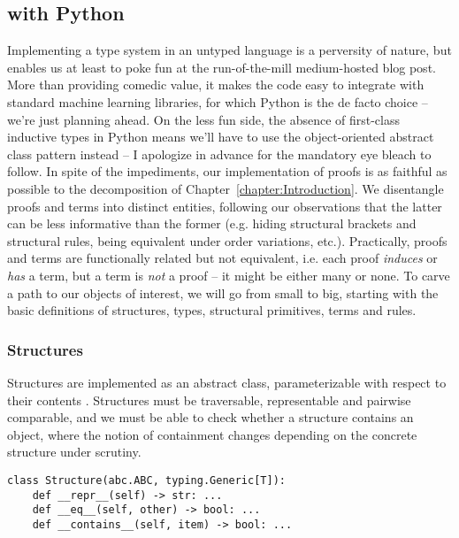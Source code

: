 \subsection{\NLPplus{} with Python}
\label{subappendix:nlp}
Implementing a type system in an untyped language is a perversity of nature, but enables us at least to poke fun at the run-of-the-mill medium-hosted blog post.
More than providing comedic value, it makes the code easy to integrate with standard machine learning libraries, for which Python is the de facto choice -- we're just planning ahead.
On the less fun side, the absence of first-class inductive types in Python means we'll have to use the object-oriented  abstract class pattern instead -- I apologize in advance for the mandatory eye bleach to follow.
In spite of the impediments, our implementation of \NLPplus{} proofs is as faithful as possible to the decomposition of Chapter~\ref{chapter:Introduction}.
We disentangle proofs and terms into distinct entities, following our observations that the latter can be less informative than the former (e.g. hiding structural brackets and structural rules, being equivalent under order variations, etc.).
Practically, proofs and terms are functionally related but not equivalent, i.e. each proof \textit{induces} or \textit{has} a term, but a term is \textit{not} a proof -- it might be either many or none.
To carve a path to our objects of interest, we will go from small to big, starting with the basic definitions of structures, types, structural primitives, terms and rules.


\subsubsection{Structures}
Structures are implemented as an abstract class, parameterizable with respect to their contents .
Structures must be traversable, representable and pairwise comparable, and we must be able to check whether a structure contains an object, where the notion of containment changes depending on the concrete structure under scrutiny.

\begin{verbatim}
class Structure(abc.ABC, typing.Generic[T]):
	def __repr__(self) -> str: ...
	def __eq__(self, other) -> bool: ...
	def __contains__(self, item) -> bool: ...
\end{verbatim}

